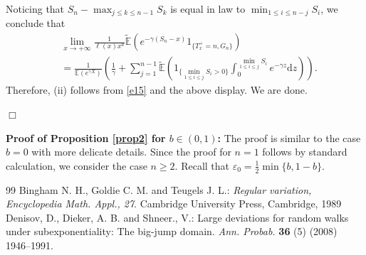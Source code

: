\documentclass[10pt,a4paper]{amsart}
\numberwithin{equation}{section}
\begin{document}
Noticing that $S_n- \max_{j\leq k\leq n-1} S_k$ is equal in law to $\min_{1\leq i\leq n-j} S_i$, we conclude that 
\begin{align}
	& \lim_{x\to+\infty} \frac{1}{\ell(x)x^a}\widetilde{\mathbb{E}}\left(e^{-\gamma (S_n-x)}1_{\{T_x^+=n, G_n\}}\right)   \nonumber\\
	&= \frac{1}{\mathbb{E}(e^{\gamma X})} \left(\frac{1}{\gamma}+ \sum_{j=1}^{n-1}\widetilde{\mathbb{E}}\left(1_{\{\min_{1\leq i\leq j} S_i>0 \}}\int_0^{\min_{1\leq i\leq j} S_i} e^{-\gamma z}\mathrm{d} z\right) \right).
\end{align}
Therefore, (ii) follows from \eqref{e15} and the above display. We are done. 

\hfill$\Box$


\noindent

\textbf{Proof of Proposition \ref{prop2}  for $b\in (0,1)$:}  The proof is similar to the case $b=0$ with more delicate details. Since the proof for $n=1$ follows by standard calculation,   we consider the case $n\geq 2$.  Recall that $\varepsilon_0= \frac{1}{2}\min\{ b, 1-b\}$. 


\begin{thebibliography}{99}
 Bingham N. H., Goldie C. M. and Teugels J. L.: \emph{Regular variation, Encyclopedia Math. Appl., 27}. Cambridge University Press, Cambridge, 1989
 Denisov, D., Dieker, A. B. and Shneer., V.: Large deviations for random walks under subexponentiality: The big-jump domain. \emph{Ann. Probab.} \textbf{36} (5) (2008) 1946--1991.
\end{thebibliography}
\end{document}

